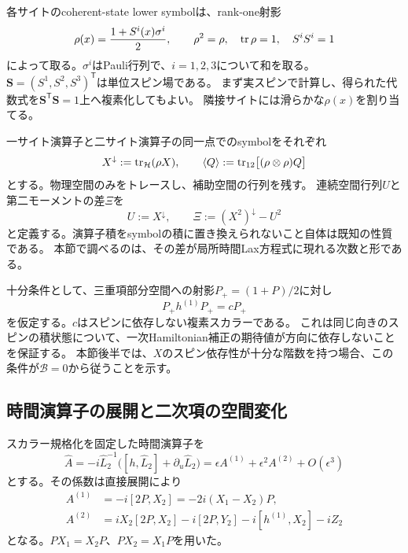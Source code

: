 各サイトのcoherent-state lower symbolは、rank-one射影
\begin{equation}
\rho(x)=\frac{1+S^i(x)\sigma^i}{2},\qquad
\rho^2=\rho,\quad\operatorname{tr}\rho=1,\quad S^iS^i=1
\label{eq:ss-rho}
\end{equation}
によって取る。$\sigma^i$はPauli行列で、$i=1,2,3$について和を取る。
$\boldsymbol S=(S^1,S^2,S^3)^{\mathsf T}$は単位スピン場である。
まず実スピンで計算し、得られた代数式を$\boldsymbol S^{\mathsf T}\boldsymbol S=1$上へ複素化してもよい。
隣接サイトには滑らかな$\rho(x)$を割り当てる。

一サイト演算子と二サイト演算子の同一点でのsymbolをそれぞれ
\begin{equation}
X^\downarrow:=\operatorname{tr}_{\mathcal H}(\rho X),\qquad
\langle Q\rangle:=\operatorname{tr}_{12}\bigl[(\rho\otimes\rho)Q\bigr]
\label{eq:ss-symbols}
\end{equation}
とする。物理空間のみをトレースし、補助空間の行列を残す。
連続空間行列$U$と第二モーメントの差$\Xi$を
\begin{equation}
U:=X^\downarrow,\qquad \Xi:=(X^2)^\downarrow-U^2
\label{eq:ss-Xi}
\end{equation}
と定義する。演算子積をsymbolの積に置き換えられないこと自体は既知の性質である。
本節で調べるのは、その差が局所時間Lax方程式に現れる次数と形である。

十分条件として、三重項部分空間への射影$P_+=(1+P)/2$に対し
\begin{equation}
P_+h^{(1)}P_+=cP_+
\label{eq:ss-triplet}
\end{equation}
を仮定する。$c$はスピンに依存しない複素スカラーである。
これは同じ向きのスピンの積状態について、一次Hamiltonian補正の期待値が方向に依存しないことを保証する。
本節後半では、$X$のスピン依存性が十分な階数を持つ場合、この条件が$\mathcal B=0$から従うことを示す。

\subsection{時間演算子の展開と二次項の空間変化}

スカラー規格化を固定した時間演算子を
\begin{equation}
\widehat A=-i\widehat L_2^{-1}
\bigl([h,\widehat L_2]+\partial_u\widehat L_2\bigr)
=\epsilon A^{(1)}+\epsilon^2A^{(2)}+O(\epsilon^3)
\label{eq:ss-time}
\end{equation}
とする。その係数は直接展開により
\begin{align}
A^{(1)}&=-i[2P,X_2]=-2i(X_1-X_2)P,\label{eq:ss-A1}\\
A^{(2)}&=iX_2[2P,X_2]-i[2P,Y_2]-i[h^{(1)},X_2]-iZ_2
\label{eq:ss-A2}
\end{align}
となる。$PX_1=X_2P$、$PX_2=X_1P$を用いた。

